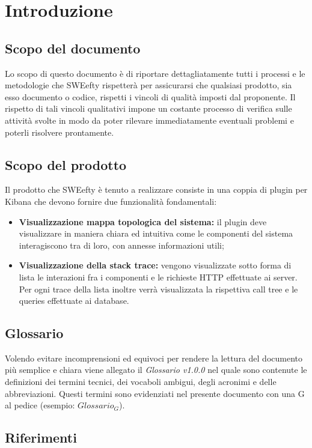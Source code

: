 \section{Introduzione}
	\subsection{Scopo del documento}
	Lo scopo di questo documento è di riportare dettagliatamente tutti i processi e le metodologie che SWEefty rispetterà per assicurarsi che qualsiasi prodotto, sia esso documento o codice, rispetti i vincoli di qualità imposti dal proponente.
	Il rispetto di tali vincoli qualitativi impone un costante processo di verifica sulle attività svolte in modo da poter rilevare immediatamente eventuali problemi e poterli risolvere prontamente.
	
	\subsection{Scopo del prodotto}
	Il prodotto che SWEefty è tenuto a realizzare consiste in una coppia di plugin per Kibana che devono fornire due funzionalità fondamentali:
	\begin{itemize}
		\item \textbf{Visualizzazione mappa topologica del sistema:} il plugin deve visualizzare in maniera chiara ed intuitiva come le componenti del sistema interagiscono tra di loro, con annesse informazioni utili;
		\item \textbf{Visualizzazione della stack trace:} vengono visualizzate sotto forma di lista le interazioni fra i componenti e le richieste HTTP effettuate ai server. Per ogni trace della lista inoltre verrà visualizzata la rispettiva call tree e le queries effettuate ai database.
	\end{itemize}

	\subsection{Glossario}
	Volendo evitare incomprensioni  ed equivoci per rendere la lettura del documento più semplice e chiara viene allegato il \emph{Glossario v1.0.0} nel quale sono contenute le definizioni dei termini tecnici, dei vocaboli ambigui, degli acronimi e delle abbreviazioni. Questi termini sono evidenziati nel presente documento con una G al pedice (esempio: $Glossario_{G}$).
	\subsection{Riferimenti}
